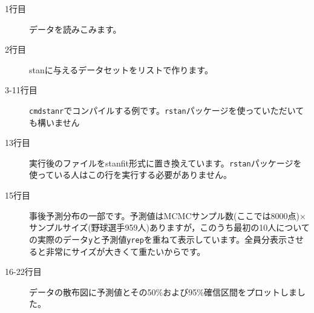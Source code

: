 \begin{description}
	\item[1行目] データを読みこみます。
	\item[2行目] stanに与えるデータセットをリストで作ります。
	\item[3-11行目] \texttt{cmdstanr}でコンパイルする例です。\texttt{rstan}パッケージを使っていただいても構いません
	\item[13行目] 実行後のファイルをstanfit形式に置き換えています。\texttt{rstan}パッケージを使っている人はこの行を実行する必要がありません。
	\item[15行目] 事後予測分布の一部です。予測値はMCMCサンプル数(ここでは8000点)$\times$サンプルサイズ(野球選手959人)ありますが，このうち最初の10人についての実際のデータ\verb|y|と予測値\verb|yrep|を重ねて表示しています。全員分表示させると非常にサイズが大きくて重たいからです。
	\item[16-22行目] データの散布図に予測値とその50\%および95\%確信区間をプロットしました。
\end{description}
